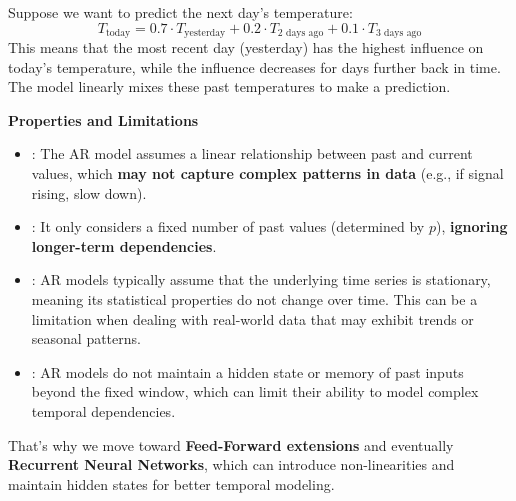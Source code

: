 \highspace
\begin{examplebox}
    Suppose we want to predict the next day's temperature:
    \begin{equation*}
        T_{\text{today}} = 0.7 \cdot T_{\text{yesterday}} + 0.2 \cdot T_{\text{2 days ago}} + 0.1 \cdot T_{\text{3 days ago}}
    \end{equation*}
    This means that the most recent day (yesterday) has the highest influence on today's temperature, while the influence decreases for days further back in time. The model linearly mixes these past temperatures to make a prediction.
\end{examplebox}

\highspace
\begin{flushleft}
    \textcolor{Red2}{ \textbf{Properties and Limitations}}
\end{flushleft}
\begin{itemize}
    \item {}: The AR model assumes a linear relationship between past and current values, which \textbf{may not capture complex patterns in data} (e.g., if signal rising, slow down).
    \item {}: It only considers a fixed number of past values (determined by $p$), \textbf{ignoring longer-term dependencies}.
    \item {}: AR models typically assume that the underlying time series is stationary, meaning its statistical properties do not change over time. This can be a limitation when dealing with real-world data that may exhibit trends or seasonal patterns.
    \item {}: AR models do not maintain a hidden state or memory of past inputs beyond the fixed window, which can limit their ability to model complex temporal dependencies.
\end{itemize}
That's why we move toward \textbf{Feed-Forward extensions} and eventually \textbf{Recurrent Neural Networks}, which can introduce non-linearities and maintain hidden states for better temporal modeling.